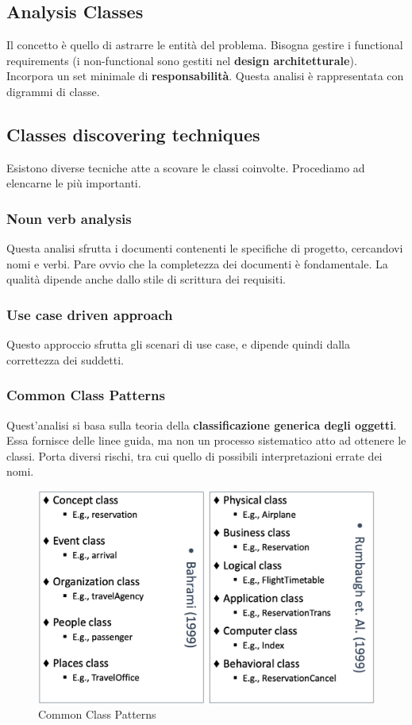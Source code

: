 \documentclass[11pt]{article}
\begin{document}
\subsection{Analysis Classes}
Il concetto è quello di astrarre le entità del problema. Bisogna gestire i functional requirements (i non-functional sono gestiti nel \textbf{design architetturale}). Incorpora un set minimale di \textbf{responsabilità}. Questa analisi è rappresentata con digrammi di classe.
\subsection{Classes discovering techniques}
Esistono diverse tecniche atte a scovare le classi coinvolte. Procediamo ad elencarne le più importanti.
\subsubsection{Noun verb analysis}
Questa analisi sfrutta i documenti contenenti le specifiche di progetto, cercandovi nomi e verbi. Pare ovvio che la completezza dei documenti è fondamentale. La qualità dipende anche dallo stile di scrittura dei requisiti. 
\subsubsection{Use case driven approach}
Questo approccio sfrutta gli scenari di use case, e dipende quindi dalla correttezza dei suddetti. 
\subsubsection{Common Class Patterns}
Quest'analisi si basa sulla teoria della \textbf{classificazione generica degli oggetti}. Essa fornisce delle linee guida, ma non un processo sistematico atto ad ottenere le classi. Porta diversi rischi, tra cui quello di possibili interpretazioni errate dei nomi. 
\begin{figure}[H]
    \centering
    \includegraphics[width=\linewidth]{res/teoria/CommonClassPatterns.png}
    \caption{Common Class Patterns}
\end{figure}
\end{document}
